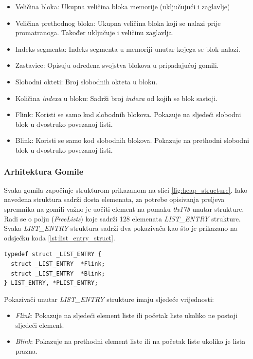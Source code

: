 \documentclass[times, utf8, diplomski, numeric]{fer}
\begin{document}
\begin{itemize}
\item Veličina bloka: Ukupna veličina bloka memorije (uključujući i zaglavlje)
\item Veličina prethodnog bloka: Ukupna veličina bloka koji se nalazi prije promatranoga. Također uključuje i veličinu zaglavlja.
\item Indeks segmenta: Indeks segmenta u memoriji unutar kojega se blok nalazi.
\item Zastavice: Opisuju određena svojstva blokova u pripadajućoj gomili.
\item Slobodni okteti: Broj slobodnih okteta u bloku.
\item Količina \emph{indexa} u bloku: Sadrži broj \emph{indexa} od kojih se blok sastoji. 
\item Flink: Koristi se samo kod slobodnih blokova. Pokazuje na sljedeći slobodni blok u dvostruko povezanoj listi.
\item Blink: Koristi se samo kod slobodnih blokova. Pokazuje na prethodni slobodni blok u dvostruko povezanoj listi.
\end{itemize}

\subsubsection{Arhitektura Gomile}

Svaka gomila započinje strukturom prikazanom na slici
\ref{fig:heap_structure}. Iako navedena struktura sadrži dosta
elemenata, za potrebe opisivanja preljeva spremnika na gomili
važno je uočiti element na pomaku \emph{0x178} unutar strukture.
Radi se o polju (\emph{FreeLists}) koje sadrži 128 elemenata
\emph{LIST\_ENTRY} strukture. Svaka \emph{LIST\_ENTRY} struktura
sadrži dva pokazivača kao što je prikazano na odsječku koda
\ref{lst:list_entry_struct}.

\begin{lstlisting}[frame=single, caption=LIST\_ENTRY struktura, label={lst:list_entry_struct}]
typedef struct _LIST_ENTRY {
  struct _LIST_ENTRY  *Flink;
  struct _LIST_ENTRY  *Blink;
} LIST_ENTRY, *PLIST_ENTRY;
\end{lstlisting}

Pokazivači unutar \emph{LIST\_ENTRY} strukture imaju sljedeće vrijednosti:

\begin{itemize}
\item \emph{Flink}: Pokazuje na sljedeći element liste ili početak liste ukoliko ne postoji sljedeći element.
\item \emph{Blink}: Pokazuje na prethodni element liste ili na početak liste ukoliko je lista prazna.
\end{itemize}
\end{document}
